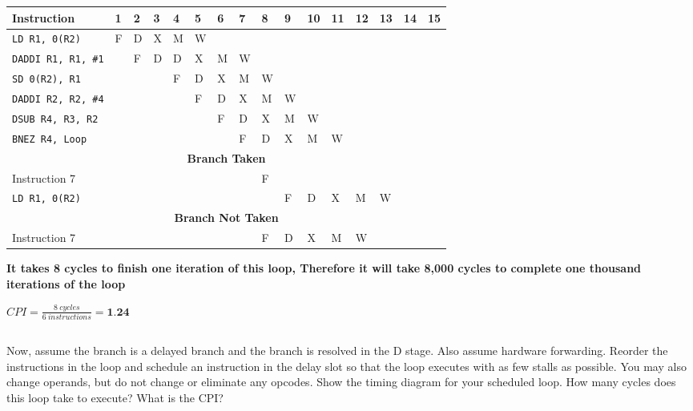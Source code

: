 \documentclass{article}
\begin{document}
\begin{adjustwidth}{2.5em}{0pt}
\vspace{5mm}
\begin{tabular}{|p{3cm}|p{.2cm}|p{.2cm}|p{.2cm}|p{.2cm}|p{.2cm}|p{.2cm}|p{.2cm}|p{.2cm}|p{.2cm}|p{.2cm}|p{.2cm}|p{.2cm}|p{.2cm}|p{.2cm}|p{.2cm}|}
\hline
\textbf{Instruction} & \textbf{1} & \textbf{2} & \textbf{3} & \textbf{4} & \textbf{5} & \textbf{6} & \textbf{7} & \textbf{8} & \textbf{9} & \textbf{10} & \textbf{11} & \textbf{12} & \textbf{13} & \textbf{14} & \textbf{15}\\
\hline
\texttt{LD R1, 0(R2)} & F & D & X & M & W & & & & & & & & & &   \\
\texttt{DADDI R1, R1, \#1}&  & F & D & D & X & M& W& & & & & & & &  \\
\texttt{SD 0(R2), R1} & &  &  & F&  D& X& M& W& & & & & & &  \\
\texttt{DADDI R2, R2, \#4} & & & & & F& D& X& M& W& & & & & &\\
\texttt{DSUB R4, R3, R2} & & & & & & F & D& X& M& W& & & & & \\
\texttt{BNEZ R4, Loop} & & & & & & & F& D& X& M& W& & & & \\

\hline
\multicolumn{16}{|c|}{\textbf{Branch Taken}}\\
\hline
Instruction 7 & & & & & & & & F & & & & & & & \\
\texttt{LD R1, 0(R2)} & & & & & & & & & F& D& X& M& W& & \\
\hline
\multicolumn{16}{|c|}{\textbf{Branch Not Taken}}\\
\hline
Instruction 7 & & & & & & & & F & D& X& M& W& & & \\
\hline
\end{tabular}

\vspace{3mm}
\textbf{It takes 8 cycles to finish one iteration of this loop, Therefore it will take 8,000 cycles to complete one thousand iterations of the loop}

\vspace{3mm}
$CPI=\frac{8\ cycles}{6\ instructions}=\textbf{1.24}$


\subsection{}
Now, assume the branch is a delayed branch and the branch is resolved in the D stage. Also assume hardware forwarding. Reorder the instructions in the loop and schedule an instruction in the delay slot so that the loop executes with as few stalls as possible. You may also change operands, but do not change or eliminate any opcodes. Show the timing diagram for your scheduled loop. How many cycles does this loop take to execute? What is the CPI?


\end{adjustwidth}
\end{document}
